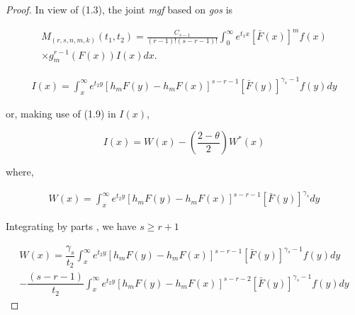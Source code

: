 \documentclass[11pt,a4paper]{article}
\numberwithin{equation}{section}
\begin{document}
	\begin{proof}

		In view of (1.3), the joint \textit{mgf} based on  \textit{gos} is

		\begin{eqnarray}

			M_{\left(r,s,n,m,k\right)}({t_{1},t_{2}}) =\frac{C_{s-1} }{\left(r-1\right)!\left(s-r-1\right)!}\int_{0}^{\infty} e^{t_{1}x }\left[\bar{F}\left(x\right)\right]^{m} f\left(x\right)\nonumber \\

			\times g_{m}^{r-1} \left(F\left(x\right)\right)I(x)dx.

		\end{eqnarray}

		\begin{eqnarray}

			I(x)=\int_{x}^{\infty}e^{t_{2}y}\left[h_{m} F\left(y\right)-h_{m} F\left(x\right)\right]^{s-r-1}\left[\bar{F}\left(y\right)\right]^{\gamma _{s} -1} f\left(y\right)dy\nonumber

		\end{eqnarray}

		or, making use of (1.9) in $I(x)$,

		\begin{equation}

			I(x)=W(x)-{\left(\dfrac{2-\theta}{2}\right)}W^{*}(x)

		\end{equation}

		where,

		\begin{eqnarray}

			W(x)= \int_{x}^{\infty}e^{t_{2}y}\left[h_{m} F\left(y\right)-h_{m} F\left(x\right)\right]^{s-r-1}\left[\bar{F}\left(y\right)\right]^{\gamma _{s}}dy\nonumber

		\end{eqnarray}

		Integrating by parts , we have $s\ge r+1$ 

		\begin{eqnarray}

			W(x)= \dfrac{\gamma_{s}}{t_{2}}\int_{x}^{\infty}e^{t_{2}y}\left[h_{m} F\left(y\right)-h_{m} F\left(x\right)\right]^{s-r-1}\left[\bar{F}\left(y\right)\right]^{\gamma _{s}-1}f(y)dy\nonumber\\

			-\dfrac{(s-r-1)}{t_{2}}\int_{x}^{\infty}e^{t_{2}y}\left[h_{m} F\left(y\right)-h_{m} F\left(x\right)\right]^{s-r-2}\left[\bar{F}\left(y\right)\right]^{\gamma _{s}-1}f(y)dy\nonumber


\end{eqnarray}
\end{proof}
\end{document}

